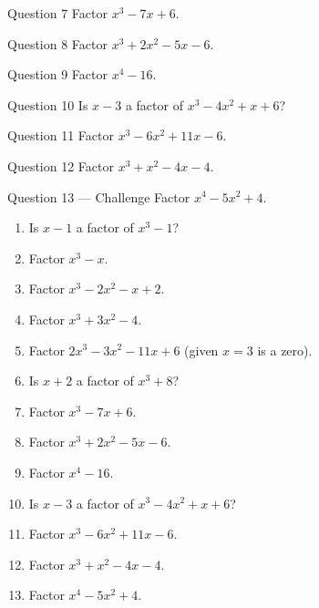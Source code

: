 \documentclass[11pt]{article}
\begin{document}
\begin{qbox}{Question 7}
Factor $x^3-7x+6$.\workspace{2.4cm}
\end{qbox}

\begin{qbox}{Question 8}
Factor $x^3+2x^2-5x-6$.\workspace{2.4cm}
\end{qbox}

\begin{qbox}{Question 9}
Factor $x^4-16$.\workspace{2.4cm}
\end{qbox}

\begin{qbox}{Question 10}
Is $x-3$ a factor of $x^3-4x^2+x+6$?\workspace{2.4cm}
\end{qbox}

\begin{qbox}{Question 11}
Factor $x^3-6x^2+11x-6$.\workspace{2.4cm}
\end{qbox}

\begin{qbox}{Question 12}
Factor $x^3+x^2-4x-4$.\workspace{2.4cm}
\end{qbox}

\begin{qbox}{Question 13 --- Challenge}
Factor $x^4-5x^2+4$.\workspace{3.2cm}
\end{qbox}

\clearpage
{}

\begin{recapbox}
\begin{multicols}{2}
\small
\begin{enumerate}[leftmargin=*,itemsep=3pt]
  \item Is $x-1$ a factor of $x^3-1$?
  \item Factor $x^3-x$.
  \item Factor $x^3-2x^2-x+2$.
  \item Factor $x^3+3x^2-4$.
  \item Factor $2x^3-3x^2-11x+6$ (given $x=3$ is a zero).
  \item Is $x+2$ a factor of $x^3+8$?
  \item Factor $x^3-7x+6$.
  \item Factor $x^3+2x^2-5x-6$.
  \item Factor $x^4-16$.
  \item Is $x-3$ a factor of $x^3-4x^2+x+6$?
  \item Factor $x^3-6x^2+11x-6$.
  \item Factor $x^3+x^2-4x-4$.
  \item Factor $x^4-5x^2+4$.
\end{enumerate}
\end{multicols}
\end{recapbox}
\end{document}
